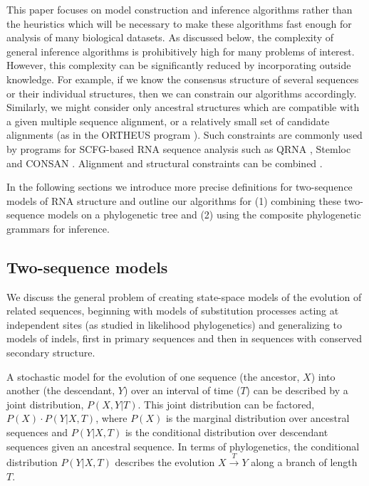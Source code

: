 \documentclass[10pt]{article}
\begin{document}
This paper focuses on model construction and inference algorithms
rather than the heuristics which will be necessary to make these
algorithms fast enough for analysis of many biological datasets.
As discussed below, the complexity of general inference algorithms is
prohibitively high for many problems of interest.
However, this complexity can be significantly
reduced by incorporating outside knowledge.  For example, if we know
the consensus structure of several sequences or their individual
structures, then we can constrain our algorithms accordingly.
Similarly, we might consider only ancestral structures which are
compatible with a given multiple sequence alignment, or a relatively small set of candidate alignments (as in the ORTHEUS program \cite{PatenHolmesBirney2008}). 
Such constraints are
commonly used by programs for SCFG-based RNA sequence analysis such as QRNA \cite{RivasEddy2001}, Stemloc \cite{Holmes2005} and CONSAN \cite{DowellEddy2006}.
Alignment and structural constraints can be combined \cite{Holmes2005}.


In the following sections we introduce more precise definitions for two-sequence
models of RNA structure and outline our algorithms for
(1) combining these two-sequence models on a phylogenetic tree and
(2) using the composite phylogenetic grammars for inference.



\subsection*{Two-sequence models} 

We discuss the general problem of creating state-space models of the
evolution of related sequences, beginning with models of substitution processes acting at independent
sites (as studied in likelihood phylogenetics) and generalizing to models of
indels, first in primary sequences and then in sequences with
conserved secondary structure.

A stochastic model for the evolution of one sequence (the ancestor, $X$) into
another (the descendant, $Y$) over an interval of time ($T$) can be described by a
joint distribution, $P (X, Y | T)$.
This joint distribution can be factored, $P (X) \cdot P (Y | X, T)$, 
where $P(X)$ is the marginal distribution over ancestral sequences
and $P(Y | X, T)$ is the conditional distribution over descendant sequences given an ancestral sequence.
In terms of phylogenetics, the conditional distribution $P(Y | X, T)$ describes the evolution $X \stackrel{T}{\to} Y$
along a branch of length $T$.
\end{document}
